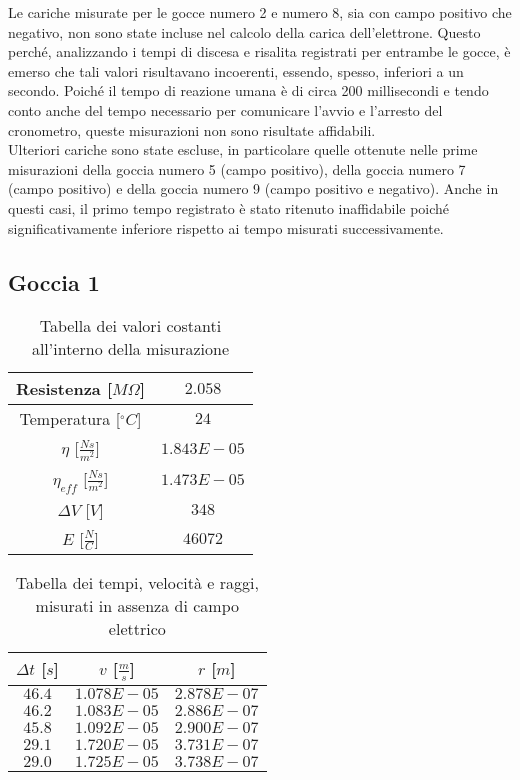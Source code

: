 \documentclass{article}
\begin{document}
Le cariche misurate per le gocce numero 2 e numero 8, sia con campo positivo che negativo, non sono state incluse nel calcolo della carica dell'elettrone. Questo perché, analizzando i tempi di discesa e risalita registrati per entrambe le gocce, è emerso che tali valori risultavano incoerenti, essendo, spesso, inferiori a un secondo. Poiché il tempo di reazione umana è di circa 200 millisecondi e tendo conto anche del tempo necessario per comunicare l'avvio e l'arresto del cronometro, queste misurazioni non sono risultate affidabili.\\

Ulteriori cariche sono state escluse, in particolare quelle ottenute nelle prime misurazioni della goccia numero 5 (campo positivo), della goccia numero 7 (campo positivo) e della goccia numero 9 (campo positivo e negativo). Anche in questi casi, il primo tempo registrato è stato ritenuto inaffidabile poiché significativamente inferiore rispetto ai tempo misurati successivamente.\\

\subsection{Goccia 1}
\begin{multicols}{2}
	
\begin{table}[H]
	\centering
	\begin{tabular}{| c | c |}
		\hline
		Resistenza [$M\Omega$] & $2.058$ \\
		\hline
		Temperatura [$^\circ C$] & $24$ \\
		\hline
		$\eta$ [$\frac{Ns}{m^2}$] & $1.843E-05$\\
		\hline
		$\eta_{eff}$ [$\frac{Ns}{m^2}$] & $1.473E-05$\\
		\hline
		$\Delta V$ [$V$] & $348$ \\
		\hline
		$E$ [$\frac N C$] & $46072$\\
		\hline
	\end{tabular}
	\caption{Tabella dei valori costanti all'interno della misurazione}
	\label{}
\end{table}

\columnbreak

\begin{table}[H]
	\centering
	\begin{tabular}{| c | c | c |}
		\hline
		$\Delta t$ [$s$] & $v$ [$\frac ms$] & $r$ [$m$] \\
		\hline
		$46.4$ & $1.078E-05$ & $2.878E-07$ \\
		$46.2$ & $1.083E-05$ & $2.886E-07$ \\
		$45.8$ & $1.092E-05$ & $2.900E-07$ \\
		$29.1$ & $1.720E-05$ & $3.731E-07$ \\
		$29.0$ & $1.725E-05$ & $3.738E-07$ \\
		\hline
	\end{tabular}
	\caption{Tabella dei tempi, velocità e raggi, misurati in assenza di campo elettrico}
	\label{}
\end{table}

\end{multicols}
\end{document}
